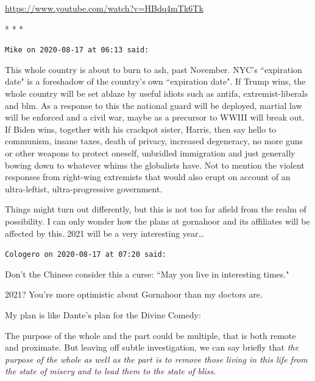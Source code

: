\url{https://www.youtube.com/watch?v=HBdq4mTk6Tk}




\begin{center}* * *\end{center}

\begin{footnotesize}\begin{sffamily}



\texttt{Mike on 2020-08-17 at 06:13 said: }

This whole country is about to burn to ash, past November. NYC's ``expiration date" is a foreshadow of the country's own ``expiration date". If Trump wins, the whole country will be set ablaze by useful idiots such as antifa, extremist-liberals and blm. As a response to this the national guard will be deployed, martial law will be enforced and a civil war, maybe as a precursor to WWIII will break out. If Biden wins, together with his crackpot sister, Harris, then say hello to communism, insane taxes, death of privacy, increased degeneracy, no more guns or other weapons to protect oneself, unbridled immigration and just generally bowing down to whatever whims the globalists have. Not to mention the violent responses from right-wing extremists that would also erupt on account of an ultra-leftist, ultra-progressive government.

Things might turn out differently, but this is not too far afield from the realm of possibility. I can only wonder how the plans at gornahoor and its affiliates will be affected by this. 2021 will be a very interesting year…


\hfill

\texttt{Cologero on 2020-08-17 at 07:20 said: }

Don't the Chinese consider this a curse: ``May you live in interesting times."

2021? You're more optimistic about Gornahoor than my doctors are.

My plan is like Dante's plan for the Divine Comedy:

\begin{quotex}
The purpose of the whole and the part could be multiple, that is both remote and proximate. But leaving off subtle investigation, we can say briefly that \emph{the purpose of the whole as well as the part is to remove those living in this life from the state of misery and to lead them to the state of bliss}. 


\end{quotex}
\end{sffamily}
\end{footnotesize}
